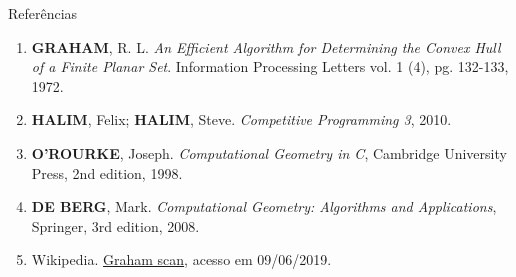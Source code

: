 \begin{frame}[fragile]{Referências}

    \begin{enumerate}
        \item \textbf{GRAHAM}, R. L. \textit{An Efficient Algorithm for Determining the Convex
           Hull of a Finite Planar Set}. Information Processing Letters vol. 1 (4), pg. 132-133,
            1972.

        \item \textbf{HALIM}, Felix; \textbf{HALIM}, Steve. \textit{Competitive Programming 3}, 2010.
        \item \textbf{O'ROURKE}, Joseph. \textit{Computational Geometry in C}, Cambridge University Press, 2nd edition, 1998. 

        \item \textbf{DE BERG}, Mark. \textit{Computational Geometry: Algorithms and Applications}, Springer, 3rd edition, 2008.

        \item Wikipedia. \href{https://en.wikipedia.org/wiki/Graham\_scan}{Graham scan}, acesso em
            09/06/2019.

    \end{enumerate}


\end{frame}
